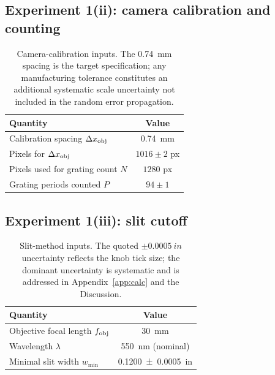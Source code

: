\documentclass[10pt,twocolumn]{article}
\begin{document}
\subsection{Experiment 1(ii): camera calibration and counting}
\begin{table}[H]
\centering
\caption{Camera-calibration inputs. The \SI{0.74}{\milli\meter} spacing is the target specification; any manufacturing tolerance constitutes an additional systematic scale uncertainty not included in the random error propagation.}
\label{tab:cameraraw}
\begin{tabular}{@{}lc@{}}
\toprule
Quantity & Value \\ \midrule
Calibration spacing $\Delta x_{\rm obj}$ & \SI{0.74}{\milli\meter} \\
Pixels for $\Delta x_{\rm obj}$ & $1016\pm2$ px \\
Pixels used for grating count $N$ & $1280$ px \\
Grating periods counted $P$ & $94\pm1$ \\ \bottomrule
\end{tabular}
\end{table}

\subsection{Experiment 1(iii): slit cutoff}
\begin{table}[H]
\centering
\caption{Slit-method inputs. The quoted $\pm\SI{0.0005}{in}$ uncertainty reflects the knob tick size; the dominant uncertainty is systematic and is addressed in Appendix~\ref{app:calc} and the Discussion.}
\label{tab:slitraw}
\begin{tabular}{@{}lc@{}}
\toprule
Quantity & Value \\ \midrule
Objective focal length $f_{\rm obj}$ & \SI{30}{\milli\meter} \\
Wavelength $\lambda$ & \SI{550}{\nano\meter} (nominal) \\
Minimal slit width $w_{\min}$ & \SI{0.1200\pm0.0005}{in} \\ \bottomrule
\end{tabular}
\end{table}
\end{document}
